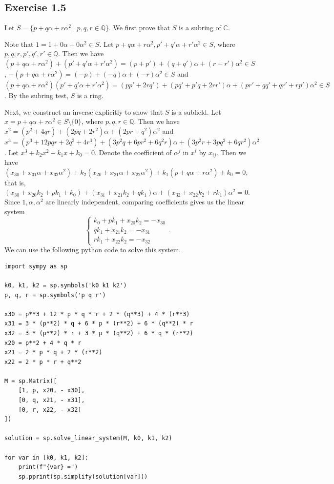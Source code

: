 \documentclass[a4paper, 12pt]{article}
\newcommand{\C}{\mathbb{C}}
\newcommand{\Q}{\mathbb{Q}}
\newcommand{\ex}[1]{
\subsection*{#1}
\addcontentsline{toc}{subsection}{#1}
}
\begin{document}
\ex{Exercise 1.5}

Let $S = \{p+q\alpha+r\alpha^2 \mid p,q,r\in\Q\}$. We first prove that $S$ is a subring of $\C$. 

Note that $1=1+0\alpha+0\alpha^2\in S$. Let $p+q\alpha+r\alpha^2,p'+q'\alpha+r'\alpha^2 \in S$, where $p,q,r,p',q',r' \in \Q$. Then we have $(p+q\alpha+r\alpha^2)+(p'+q'\alpha+r'\alpha^2) = (p+p') + (q+q')\alpha + (r+r')\alpha^2 \in S$, $-(p+q\alpha+r\alpha^2) = (-p) + (-q)\alpha + (-r)\alpha^2 \in S$ and $(p+q\alpha+r\alpha^2)(p'+q'\alpha+r'\alpha^2) = (pp'+2rq') + (pq'+p'q+2rr')\alpha + (pr'+qq'+qr'+rp')\alpha^2 \in S$. By the subring test, $S$ is a ring.

Next, we construct an inverse explicitly to show that $S$ is a subfield. Let $x = p+q\alpha+r\alpha^2 \in S \setminus \{0\}$, where $p,q,r \in \Q$. Then we have $x^2=(p^2+4qr)+(2pq+2r^2)\alpha+(2pr+q^2)\alpha^2$ and $x^3=(p^3+12pqr+2q^3+4r^3)+(3p^2q+6pr^2+6q^2r)\alpha+(3p^2r+3pq^2+6qr^2)\alpha^2$. Let $x^3+k_2x^2+k_1x+k_0=0$. Denote the coefficient of $\alpha^j$ in $x^i$ by $x_{ij}$. Then we have $(x_{30}+x_{31}\alpha+x_{32}\alpha^2)+k_2(x_{20}+x_{21}\alpha+x_{22}\alpha^2)+k_1(p+q\alpha+r\alpha^2)+k_0=0$, that is, $(x_{30}+x_{20}k_2+pk_1+k_0) + (x_{31}+x_{21}k_2+qk_1)\alpha + (x_{32}+x_{22}k_2+rk_1)\alpha^2 = 0$. Since $1,\alpha,\alpha^2$ are linearly independent, comparing coefficients gives us the linear system
\[ \begin{cases}
    k_0 + pk_1 + x_{20}k_2 = -x_{30} \\
    qk_1 + x_{21}k_2 = -x_{31} \\
    rk_1 + x_{22}k_2 = -x_{32}
\end{cases}. \]
We can use the following python code to solve this system.

\begin{verbatim}
import sympy as sp

k0, k1, k2 = sp.symbols('k0 k1 k2')
p, q, r = sp.symbols('p q r')

x30 = p**3 + 12 * p * q * r + 2 * (q**3) + 4 * (r**3)
x31 = 3 * (p**2) * q + 6 * p * (r**2) + 6 * (q**2) * r
x32 = 3 * (p**2) * r + 3 * p * (q**2) + 6 * q * (r**2)
x20 = p**2 + 4 * q * r
x21 = 2 * p * q + 2 * (r**2)
x22 = 2 * p * r + q**2

M = sp.Matrix([
    [1, p, x20, - x30],
    [0, q, x21, - x31],
    [0, r, x22, - x32]
])

solution = sp.solve_linear_system(M, k0, k1, k2)

for var in [k0, k1, k2]:
    print(f"{var} =")
    sp.pprint(sp.simplify(solution[var]))
\end{verbatim}
\end{document}

